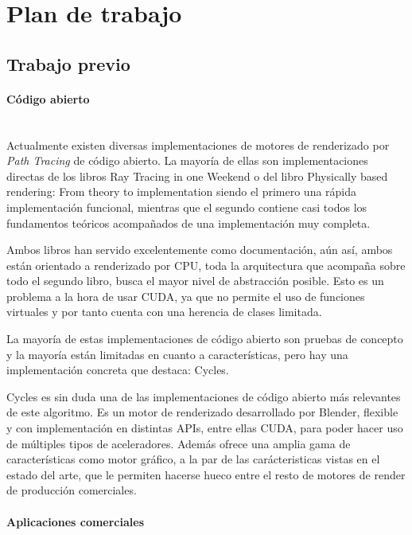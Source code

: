 \section{Plan de trabajo}
	
\subsection{Trabajo previo}

\paragraph{Código abierto}\mbox{} \\

Actualmente existen diversas implementaciones de motores de renderizado por \emph{Path Tracing} de código abierto. La mayoría de ellas son implementaciones directas de los libros Ray Tracing in one Weekend \cite{shirley2016ray} o del libro Physically based rendering: From theory to implementation \cite{pharr2016physically} siendo el primero una rápida implementación funcional, mientras que el segundo contiene casi todos los fundamentos teóricos acompañados de una implementación muy completa.

Ambos libros han servido excelentemente como documentación, aún así, ambos están orientado a renderizado por CPU, toda la arquitectura que acompaña sobre todo el segundo libro, busca el mayor nivel de abstracción posible. Esto es un problema a la hora de usar CUDA, ya que no permite el uso de funciones virtuales y por tanto cuenta con una herencia de clases limitada.

La mayoría de estas implementaciones de código abierto son pruebas de concepto y la mayoría están limitadas en cuanto a características, pero hay una implementación concreta que destaca: Cycles.

Cycles es sin duda una de las implementaciones de código abierto más relevantes de este algoritmo. Es un motor de renderizado desarrollado por Blender, flexible y con implementación en distintas APIs, entre ellas CUDA, para poder hacer uso de múltiples tipos de aceleradores. Además ofrece una amplia gama de características como motor gráfico, a la par de las carácteristicas vistas en el estado del arte, que le permiten hacerse hueco entre el resto de motores de render de producción comerciales.

\paragraph{Aplicaciones comerciales}\mbox{} \\

